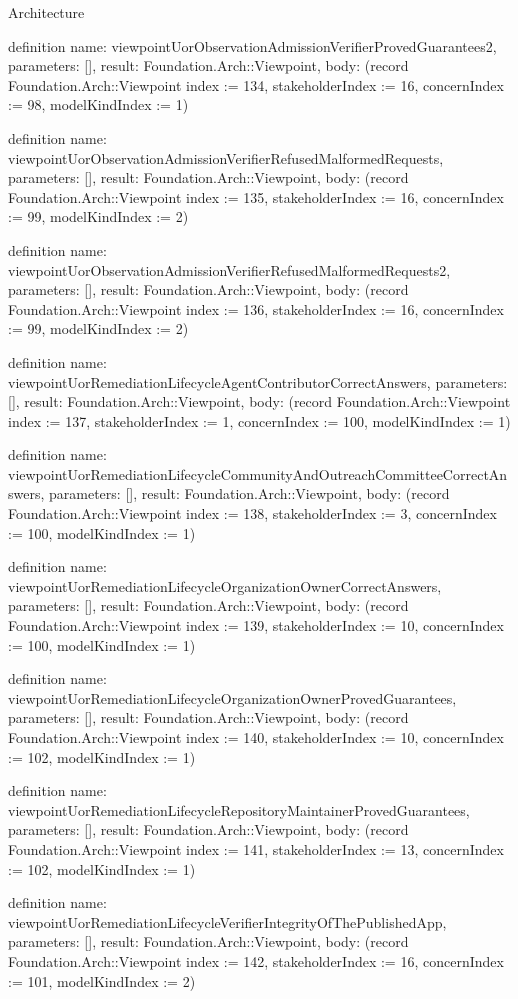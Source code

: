\begin{lexlean}{Architecture}
\begin{semanticmodule}
definition{
  name: viewpointUorObservationAdmissionVerifierProvedGuarantees2,
  parameters: [],
  result: Foundation.Arch::Viewpoint,
  body: (record Foundation.Arch::Viewpoint {index := 134, stakeholderIndex := 16, concernIndex := 98, modelKindIndex := 1})
}

definition{
  name: viewpointUorObservationAdmissionVerifierRefusedMalformedRequests,
  parameters: [],
  result: Foundation.Arch::Viewpoint,
  body: (record Foundation.Arch::Viewpoint {index := 135, stakeholderIndex := 16, concernIndex := 99, modelKindIndex := 2})
}

definition{
  name: viewpointUorObservationAdmissionVerifierRefusedMalformedRequests2,
  parameters: [],
  result: Foundation.Arch::Viewpoint,
  body: (record Foundation.Arch::Viewpoint {index := 136, stakeholderIndex := 16, concernIndex := 99, modelKindIndex := 2})
}

definition{
  name: viewpointUorRemediationLifecycleAgentContributorCorrectAnswers,
  parameters: [],
  result: Foundation.Arch::Viewpoint,
  body: (record Foundation.Arch::Viewpoint {index := 137, stakeholderIndex := 1, concernIndex := 100, modelKindIndex := 1})
}

definition{
  name: viewpointUorRemediationLifecycleCommunityAndOutreachCommitteeCorrectAnswers,
  parameters: [],
  result: Foundation.Arch::Viewpoint,
  body: (record Foundation.Arch::Viewpoint {index := 138, stakeholderIndex := 3, concernIndex := 100, modelKindIndex := 1})
}

definition{
  name: viewpointUorRemediationLifecycleOrganizationOwnerCorrectAnswers,
  parameters: [],
  result: Foundation.Arch::Viewpoint,
  body: (record Foundation.Arch::Viewpoint {index := 139, stakeholderIndex := 10, concernIndex := 100, modelKindIndex := 1})
}

definition{
  name: viewpointUorRemediationLifecycleOrganizationOwnerProvedGuarantees,
  parameters: [],
  result: Foundation.Arch::Viewpoint,
  body: (record Foundation.Arch::Viewpoint {index := 140, stakeholderIndex := 10, concernIndex := 102, modelKindIndex := 1})
}

definition{
  name: viewpointUorRemediationLifecycleRepositoryMaintainerProvedGuarantees,
  parameters: [],
  result: Foundation.Arch::Viewpoint,
  body: (record Foundation.Arch::Viewpoint {index := 141, stakeholderIndex := 13, concernIndex := 102, modelKindIndex := 1})
}

definition{
  name: viewpointUorRemediationLifecycleVerifierIntegrityOfThePublishedApp,
  parameters: [],
  result: Foundation.Arch::Viewpoint,
  body: (record Foundation.Arch::Viewpoint {index := 142, stakeholderIndex := 16, concernIndex := 101, modelKindIndex := 2})
}


\end{semanticmodule}
\end{lexlean}
